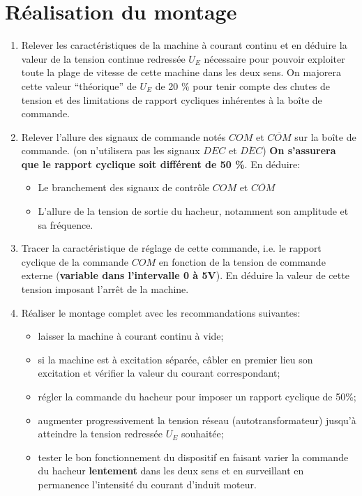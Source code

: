\newpage
\section{Réalisation du montage}

\begin{enumerate}
\item Relever les caractéristiques de la machine à courant continu et en déduire la valeur de la tension continue redressée $U_E$ nécessaire pour pouvoir exploiter toute la plage de vitesse de cette machine dans les deux sens. On majorera cette valeur ``théorique'' de $U_E$ de 20 \% pour tenir compte des chutes de tension et des limitations de rapport cycliques inhérentes à la boîte de commande.

\item Relever l’allure des signaux de commande notés $COM$ et $\overline{COM}$ sur la boîte de commande. (on n'utilisera pas les signaux $DEC$ et $\overline{DEC}$) \textbf{On s'assurera que le rapport cyclique soit différent de 50 \%}. En déduire:
\begin{itemize}
\item Le branchement des signaux de contrôle $COM$ et $\overline{COM}$
\item L’allure de la tension de sortie du hacheur, notamment son amplitude et sa fréquence.
\end{itemize}

\item Tracer la caractéristique de réglage de cette commande, i.e. le rapport cyclique de la commande $COM$ en fonction de la tension de commande externe (\textbf{variable dans l’intervalle 0 à 5V}). En déduire la valeur de cette tension imposant l’arrêt de la machine.

\item Réaliser le montage complet avec les recommandations suivantes:
\begin{itemize}
\item laisser la machine à courant continu à vide;
\item si la machine est à excitation séparée, câbler en premier lieu son excitation et vérifier la valeur du courant correspondant;
\item régler la commande du hacheur pour imposer un rapport cyclique de 50\%;
\item augmenter progressivement la tension réseau (autotransformateur) jusqu’à atteindre la tension redressée $U_E$ souhaitée;
\item tester le bon fonctionnement du dispositif en faisant varier la commande du hacheur \textbf{lentement} dans les deux sens et en surveillant en permanence l’intensité du courant d’induit moteur.
\end{itemize}


\end{enumerate}
